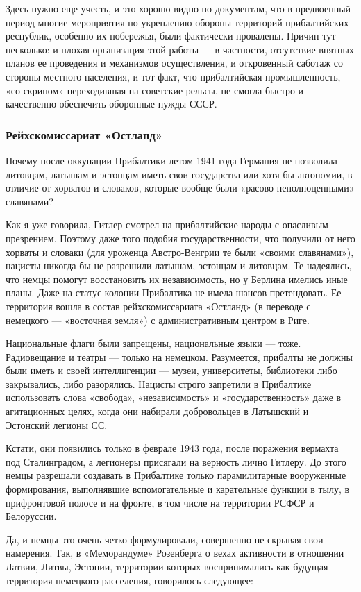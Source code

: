 Здесь нужно еще учесть, и это хорошо видно по документам, что в предвоенный
период многие мероприятия по укреплению обороны территорий прибалтийских
республик, особенно их побережья, были фактически провалены. Причин тут
несколько: и плохая организация этой работы — в частности, отсутствие внятных
планов ее проведения и механизмов осуществления, и откровенный саботаж со
стороны местного населения, и тот факт, что прибалтийская промышленность, «со
скрипом» переходившая на советские рельсы, не смогла быстро и качественно
обеспечить оборонные нужды СССР.

\subsubsection{Рейхскомиссариат «Остланд»}

Почему после оккупации Прибалтики летом 1941 года Германия не позволила
литовцам, латышам и эстонцам иметь свои государства или хотя бы автономии, в
отличие от хорватов и словаков, которые вообще были «расово неполноценными»
славянами?

Как я уже говорила, Гитлер смотрел на прибалтийские народы с опасливым
презрением. Поэтому даже того подобия государственности, что получили от него
хорваты и словаки (для уроженца Австро-Венгрии те были «своими славянами»),
нацисты никогда бы не разрешили латышам, эстонцам и литовцам. Те надеялись, что
немцы помогут восстановить их независимость, но у Берлина имелись иные планы.
Даже на статус колонии Прибалтика не имела шансов претендовать. Ее территория
вошла в состав рейхскомиссариата «Остланд» (в переводе с немецкого — «восточная
земля») с административным центром в Риге.

Национальные флаги были запрещены, национальные языки — тоже. Радиовещание и
театры — только на немецком. Разумеется, прибалты не должны были иметь и своей
интеллигенции — музеи, университеты, библиотеки либо закрывались, либо
разорялись. Нацисты строго запретили в Прибалтике использовать слова «свобода»,
«независимость» и «государственность» даже в агитационных целях, когда они
набирали добровольцев в Латышский и Эстонский легионы СС.

Кстати, они появились только в феврале 1943 года, после поражения вермахта под
Сталинградом, а легионеры присягали на верность лично Гитлеру. До этого немцы
разрешали создавать в Прибалтике только парамилитарные вооруженные
формирования, выполнявшие вспомогательные и карательные функции в тылу, в
прифронтовой полосе и на фронте, в том числе на территории РСФСР и Белоруссии.


Да, и немцы это очень четко формулировали, совершенно не скрывая свои
намерения. Так, в «Меморандуме» Розенберга о вехах активности в отношении
Латвии, Литвы, Эстонии, территории которых воспринимались как будущая
территория немецкого расселения, говорилось следующее:
